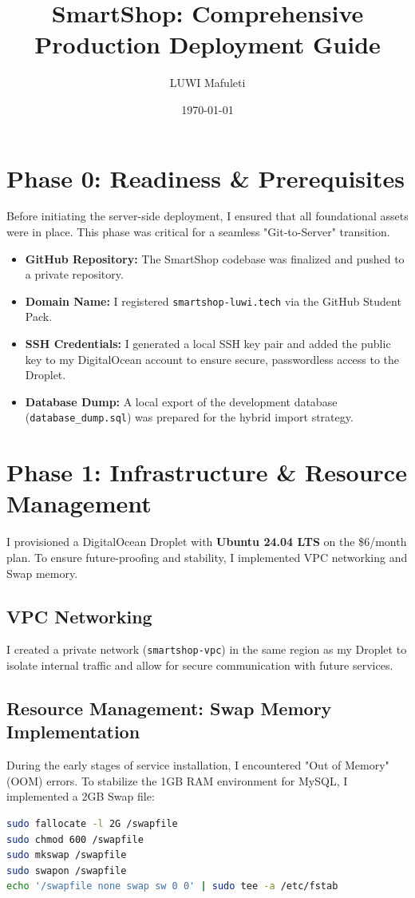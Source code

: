\documentclass[12pt,a4paper]{article}
\title{\textbf{SmartShop: Comprehensive Production Deployment Guide}}
\author{LUWI Mafuleti}
\date{\today}
\begin{document}
\maketitle
\tableofcontents
\newpage

\section{Phase 0: Readiness \& Prerequisites}
Before initiating the server-side deployment, I ensured that all foundational assets were in place. This phase was critical for a seamless "Git-to-Server" transition.

\begin{itemize}
    \item \textbf{GitHub Repository:} The SmartShop codebase was finalized and pushed to a private repository.
    \item \textbf{Domain Name:} I registered \texttt{smartshop-luwi.tech} via the GitHub Student Pack.
    \item \textbf{SSH Credentials:} I generated a local SSH key pair and added the public key to my DigitalOcean account to ensure secure, passwordless access to the Droplet.
    \item \textbf{Database Dump:} A local export of the development database (\texttt{database\_dump.sql}) was prepared for the hybrid import strategy.
\end{itemize}

\newpage

\section{Phase 1: Infrastructure \& Resource Management}
I provisioned a DigitalOcean Droplet with \textbf{Ubuntu 24.04 LTS} on the \$6/month plan. To ensure future-proofing and stability, I implemented VPC networking and Swap memory.

\subsection{VPC Networking}
I created a private network (\texttt{smartshop-vpc}) in the same region as my Droplet to isolate internal traffic and allow for secure communication with future services.

\subsection{Resource Management: Swap Memory Implementation}
During the early stages of service installation, I encountered "Out of Memory" (OOM) errors. To stabilize the 1GB RAM environment for MySQL, I implemented a 2GB Swap file:
\begin{lstlisting}[language=bash]
sudo fallocate -l 2G /swapfile
sudo chmod 600 /swapfile
sudo mkswap /swapfile
sudo swapon /swapfile
echo '/swapfile none swap sw 0 0' | sudo tee -a /etc/fstab
\end{lstlisting}
\end{document}
